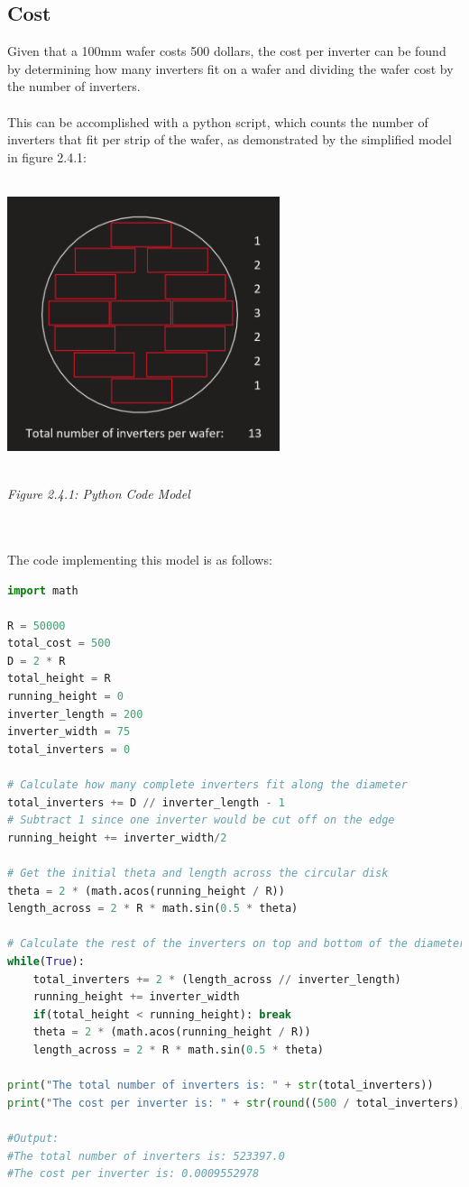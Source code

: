 \documentclass[12pt]{article}
\begin{document}
\subsection{Cost}
Given that a 100mm wafer costs 500 dollars, the cost per inverter can be found by determining how many inverters fit on a wafer and dividing the wafer cost by the number of inverters.
\\
\\This can be accomplished with a python script, which counts the number of inverters that fit per strip of the wafer, as demonstrated by the simplified model in figure 2.4.1:
\\
\\\centerline{\includegraphics[width=8cm] {Python Code Model.PNG}}
\begin{center}
\\\emph{Figure 2.4.1: Python Code Model}
\end{center}
\\
\\The code implementing this model is as follows:
\begin{lstlisting}[language=Python, caption=Cost Per Inverter Code]
import math

R = 50000
total_cost = 500
D = 2 * R
total_height = R
running_height = 0
inverter_length = 200
inverter_width = 75
total_inverters = 0

# Calculate how many complete inverters fit along the diameter
total_inverters += D // inverter_length - 1
# Subtract 1 since one inverter would be cut off on the edge
running_height += inverter_width/2

# Get the initial theta and length across the circular disk
theta = 2 * (math.acos(running_height / R))
length_across = 2 * R * math.sin(0.5 * theta)

# Calculate the rest of the inverters on top and bottom of the diameter
while(True):
    total_inverters += 2 * (length_across // inverter_length)
    running_height += inverter_width
    if(total_height < running_height): break
    theta = 2 * (math.acos(running_height / R))
    length_across = 2 * R * math.sin(0.5 * theta)

print("The total number of inverters is: " + str(total_inverters))
print("The cost per inverter is: " + str(round((500 / total_inverters), 10)))

#Output:
#The total number of inverters is: 523397.0
#The cost per inverter is: 0.0009552978
\end{lstlisting}
\end{document}

